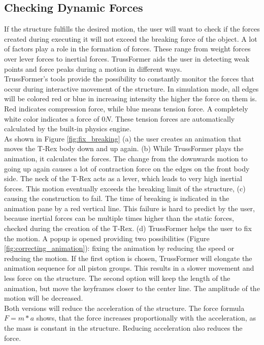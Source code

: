\subsection{Checking Dynamic Forces}
If the structure fulfills the desired motion, the user will want to check if the forces created during executing it will not exceed the breaking force of the object. A lot of factors play a role in the formation of forces. These range from weight forces over lever forces to inertial forces. TrussFormer aids the user in detecting weak points and force peaks during a motion in different ways.\\
TrussFormer's tools provide the possibility to constantly monitor the forces that occur during interactive movement of the structure. In simulation mode, all edges will be colored red or blue in increasing intensity the higher the force on them is. Red indicates compression force, while blue means tension force. A completely white color indicates a force of $0 N$. These tension forces are automatically calculated by the built-in physics engine.\\
As shown in Figure \ref{fig:fix_breaking} (a) the user creates an animation that moves the T-Rex body down and up again. (b) While TrussFormer plays the animation, it calculates the forces. The change from the downwards motion to going up again causes a lot of contraction force on the edges on the front body side. The neck of the T-Rex acts as a lever, which leads to very high inertial forces. This motion eventually exceeds the breaking limit of the structure, (c) causing the construction to fail. The time of breaking is indicated in the animation pane by a red vertical line. This failure is hard to predict by the user, because inertial forces can be multiple times higher than the static forces, checked during the creation of the T-Rex. (d) TrussFormer helps the user to fix the motion. A popup is opened providing two possibilities (Figure \ref{fig:correcting_animation}): fixing the animation by reducing the speed or reducing the motion. If the first option is chosen, TrussFormer will elongate the animation sequence for all piston groups. This results in a slower movement and less force on the structure. The second option will keep the length of the animation, but move the keyframes closer to the center line. The amplitude of the motion will be decreased.\\
Both versions will reduce the acceleration of the structure. The force formula $F = m * a$ shows, that the force increases proportionally with the acceleration, as the mass is constant in the structure. Reducing acceleration also reduces the force.
